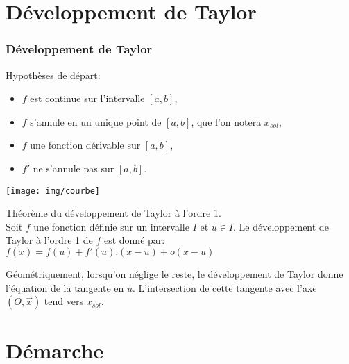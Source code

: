 

\section{Développement de Taylor} 

\begin{frame}[fragile]
\frametitle{Développement de Taylor}

\begin{minipage}{0.45\linewidth}
Hypothèses de départ:
\begin{itemize}
	\item $f$ est continue sur l'intervalle $[a,b]$,
	\item $f$ s'annule en un unique point de $[a,b]$, que l'on notera $x_{sol}$,
	\item $f$ une fonction dérivable sur $[a,b]$,
	\item $f'$ ne s'annule pas sur $[a,b]$.
\end{itemize}

\end{minipage}\hfill
\begin{minipage}{0.5\linewidth}
 \texttt{[image: img/courbe]}
\end{minipage}

\begin{defi}
Théorème du développement de Taylor à l'ordre 1. \\
Soit $f$ une fonction définie sur un intervalle $I$ et $u\in I$. Le développement de Taylor à l'ordre 1 de $f$ est donné par:\\
$f(x)=f(u)+f'(u).(x-u)+o(x-u)$
\end{defi}

Géométriquement, lorsqu'on néglige le reste, le développement de Taylor donne l'équation de la tangente en $u$. L'intersection de cette tangente avec l'axe $(O,\overrightarrow{x})$ tend vers $x_{sol}$.

\end{frame}

\section{Démarche} 

